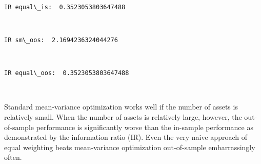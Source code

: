 \documentclass[11pt]{article}
\begin{document}
    \begin{center}
    \end{center}
    { \hspace*{\fill} \\}
    
    \begin{Verbatim}[commandchars=\\\{\},fontsize=\footnotesize]
IR equal\_is:  0.3523053803647488

    \end{Verbatim}

    \begin{center}
    \end{center}
    { \hspace*{\fill} \\}
    
    \begin{Verbatim}[commandchars=\\\{\},fontsize=\footnotesize]
IR sm\_oos:  2.1694236324044276

    \end{Verbatim}

    \begin{center}
    \end{center}
    { \hspace*{\fill} \\}
    
    \begin{Verbatim}[commandchars=\\\{\},fontsize=\footnotesize]
IR equal\_oos:  0.3523053803647488

    \end{Verbatim}

    \begin{center}
    \end{center}
    { \hspace*{\fill} \\}
    
    Standard mean-variance optimization works well if the number of assets
is relatively small. When the number of assets is relatively large,
however, the out-of-sample performance is significantly worse than the
in-sample performance as demonstrated by the information ratio (IR).
Even the very naive approach of equal weighting beats mean-variance
optimization out-of-sample embarrassingly often.
\end{document}
